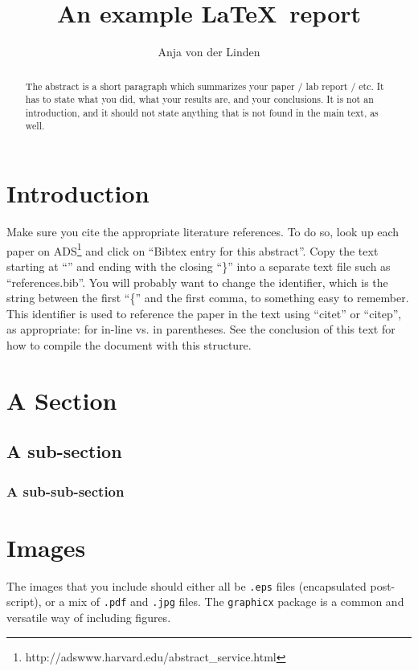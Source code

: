 \documentclass[preprint]{aastex631}
\begin{document}
\title{An example \LaTeX\ report}

\author{Anja von der Linden}

\begin{abstract}
The abstract is a short paragraph which summarizes your paper / lab report / etc. It has to state what you did, what your results are, and your conclusions.  It is not an introduction, and it should not state anything that is not found in the main text, as well.
\end{abstract}

\section{Introduction}

Make sure you cite the appropriate literature references.  To do so, look up each paper on ADS\footnote{http://adswww.harvard.edu/abstract\_service.html} and click on ``Bibtex entry for this abstract''.  Copy the text starting at ``\@'' and ending with the closing ``\}'' into a separate text file such as ``references.bib''.  You will probably want to change the identifier, which is the string between the first ``\{'' and the first comma, to something easy to remember.  This identifier is used to reference the paper in the text using ``citet'' or ``citep'', as appropriate: \citet{vdL14} for in-line vs. \citep{vdL14} in parentheses.  See the conclusion of this text for how to compile the document with this structure.

\section{A Section}

\subsection{A sub-section}

\subsubsection{A sub-sub-section}

\section{Images}

The images that you include should either all be {\tt .eps} files (encapsulated post-script), or a mix of {\tt .pdf} and {\tt .jpg} files.  The {\tt graphicx} package is a common and versatile way of including figures.
\end{document}
